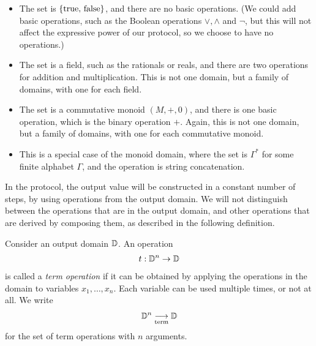 \begin{itemize}
    \item {} The set is $\{\text{true, false}\}$, and there are no basic operations. (We could add basic operations, such as the Boolean operations $\lor,\land$ and $\neg$, but this will not affect the expressive power of our protocol, so we choose to have no operations.)
    \item {} The set is a field, such as the rationals or reals, and there are two operations for addition and multiplication. This is not one domain, but a family of domains, with one for each field.
    \item {} The set is a commutative monoid $(M,+,0)$, and there is one basic operation, which is the binary operation $+$. Again, this is not one domain, but a family of domains, with one for each commutative monoid.
    \item {} This is a special case of the monoid domain, where the set is $\Gamma^*$ for some finite alphabet $\Gamma$, and the operation is string concatenation.
\end{itemize}

In the protocol, the output value will be constructed in a constant number of
steps, by using operations from the output domain. We will not distinguish
between the operations that are in the output domain, and other operations
that are derived by composing them, as described in the following definition.

\begin{definition}\label{def:term-operations}
    Consider an output domain $\mathbb D$. An operation 
    \begin{align*}
    t : \mathbb D^n \to \mathbb D
    \end{align*}
    is called a \emph{term operation} if it can be obtained by applying the operations in the domain to variables $x_1,\ldots,x_n$. Each variable can be used multiple times, or not at all.  We write 
    \begin{align*}
    \mathbb D^n \underset{\text{term}}{\longrightarrow} \mathbb D
    \end{align*}
    for the set of term operations with $n$ arguments.
\end{definition}

